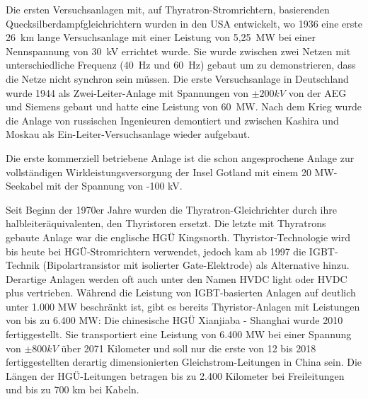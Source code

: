Die ersten Versuchsanlagen mit, auf Thyratron-Stromrichtern, basierenden Quecksilberdampfgleichrichtern wurden in den USA entwickelt, wo 1936 eine erste 26\ km lange Versuchsanlage mit einer Leistung von 5,25\ MW bei einer Nennspannung von 30\ kV errichtet wurde. Sie wurde zwischen zwei Netzen mit unterschiedliche Frequenz (40\ Hz und 60\ Hz) gebaut um zu demonstrieren, dass die Netze nicht synchron sein müssen. Die erste Versuchsanlage in Deutschland wurde 1944 als Zwei-Leiter-Anlage mit Spannungen von $\pm 200 kV$ von der AEG und Siemens gebaut und hatte eine Leistung von 60\ MW. Nach dem Krieg wurde die Anlage von russischen Ingenieuren demontiert und zwischen Kashira und Moskau als Ein-Leiter-Versuchsanlage wieder aufgebaut.

Die erste kommerziell betriebene Anlage ist die schon angesprochene Anlage zur vollständigen Wirkleistungsversorgung der Insel Gotland mit einem 20 MW-Seekabel mit der Spannung von -100 kV.

Seit Beginn der 1970er Jahre wurden die Thyratron-Gleichrichter durch ihre halbleiteräquivalenten, den Thyristoren ersetzt. Die letzte mit Thyratrons gebaute Anlage war die englische HGÜ Kingsnorth. Thyristor-Technologie wird bis heute bei HGÜ-Stromrichtern verwendet, jedoch kam ab 1997 die IGBT-Technik (Bipolartransistor mit isolierter Gate-Elektrode) als Alternative hinzu. Derartige Anlagen werden oft auch unter den Namen HVDC light oder HVDC plus vertrieben.
Während die Leistung von IGBT-basierten Anlagen auf deutlich unter 1.000 MW beschränkt ist, gibt es bereits Thyristor-Anlagen mit Leistungen von bis zu 6.400 MW:
Die chinesische HGÜ Xianjiaba - Shanghai wurde 2010 fertiggestellt.\cite{Kao}
Sie transportiert eine Leistung von 6.400 MW bei einer Spannung von $\pm800 kV$ über 2071 Kilometer und
soll nur die erste von 12 bis 2018 fertiggestellten derartig dimensionierten Gleichstrom-Leitungen in China sein.\cite{Liste}
Die Längen der HGÜ-Leitungen betragen bis zu 2.400 Kilometer bei Freileitungen und bis zu 700 km bei Kabeln.\cite{Liste} 

